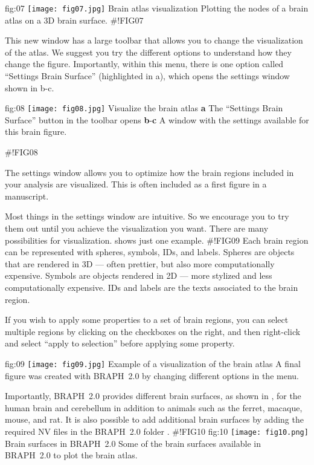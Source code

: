 \documentclass[justified]{tufte-handout}
\begin{document}
	{fig:07}
	{\texttt{[image: fig07.jpg]}}
	{Brain atlas visualization}
	{
	Plotting the nodes of a brain atlas on a 3D brain surface. 
	}
#!FIG07
	
This new window has a large toolbar that allows you to change the visualization of the atlas. We suggest you try the different options to understand how they change the figure. Importantly, within this menu, there is one option called ``Settings Brain Surface'' (highlighted in a), which opens the settings window shown in b-c.

	{fig:08}
	{\texttt{[image: fig08.jpg]}}
	{Visualize the brain atlas}
	{
	{\bf a} The ``Settings Brain Surface'' button in the toolbar opens {\bf b}-{\bf c} A window with the settings available for this brain figure.
	}

#!FIG08

The settings window allows you to optimize how the brain regions included in your analysis are visualized. This is often included as a first figure in a manuscript.

Most things in the settings window are intuitive. So we encourage you to try them out until you achieve the visualization you want. There are many possibilities for visualization.  shows just one example.
#!FIG09
Each brain region can be represented with spheres, symbols, IDs, and labels.
Spheres are objects that are rendered in 3D --- often prettier, but also more computationally expensive.
Symbols are objects rendered in 2D --- more stylized and less computationally expensive.
IDs and labels are the texts associated to the brain region.

If you wish to apply some properties to a set of brain regions, you can select multiple regions by clicking on the checkboxes on the right, and then right-click and select ``apply to selection'' before applying some property.

	{fig:09}
	{\texttt{[image: fig09.jpg]}}
	{Example of a visualization of the brain atlas}
	{
	A final figure was created with BRAPH~2.0 by changing different options in the menu.
	}

Importantly, BRAPH~2.0 provides different brain surfaces, as shown in , for the human brain and cerebellum in addition to animals such as the ferret, macaque, mouse, and rat.
It is also possible to add additional brain surfaces by adding the required NV files in the BRAPH~2.0 folder .
#!FIG10
	{fig:10}
	{\texttt{[image: fig10.png]}}
	{Brain surfaces in BRAPH~2.0}
	{
	Some of the brain surfaces available in BRAPH~2.0 to plot the brain atlas.
	}
\end{document}
